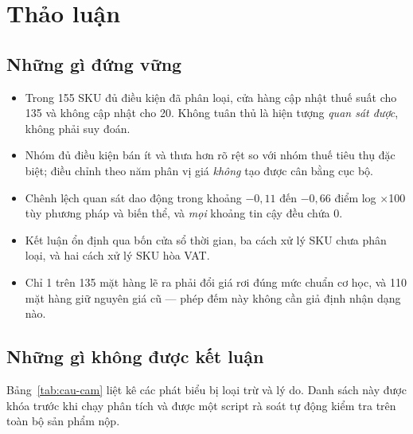 \documentclass[11pt]{article}
\newcommand{\dvi}{điểm log $\times$100}
\begin{document}
\section{Thảo luận}

\subsection{Những gì đứng vững}

\begin{itemize}
  \item Trong 155 SKU đủ điều kiện đã phân loại, cửa hàng cập nhật thuế suất cho 135 và không cập
  nhật cho 20. Không tuân thủ là hiện tượng \emph{quan sát được}, không phải suy đoán.
  \item Nhóm đủ điều kiện bán ít và thưa hơn rõ rệt so với nhóm thuế tiêu thụ đặc biệt; điều chỉnh
  theo năm phân vị giá \emph{không} tạo được cân bằng cục bộ.
  \item Chênh lệch quan sát dao động trong khoảng $-0{,}11$ đến $-0{,}66$ \dvi{} tùy phương pháp và
  biến thể, và \emph{mọi} khoảng tin cậy đều chứa 0.
  \item Kết luận ổn định qua bốn cửa sổ thời gian, ba cách xử lý SKU chưa phân loại, và hai cách xử
  lý SKU hòa VAT.
  \item Chỉ 1 trên 135 mặt hàng lẽ ra phải đổi giá rơi đúng mức chuẩn cơ học, và 110 mặt hàng giữ
  nguyên giá cũ --- phép đếm này không cần giả định nhận dạng nào.
\end{itemize}

\subsection{Những gì không được kết luận}

Bảng~\ref{tab:cau-cam} liệt kê các phát biểu bị loại trừ và lý do. Danh sách này được khóa trước
khi chạy phân tích và được một script rà soát tự động kiểm tra trên toàn bộ sản phẩm nộp.
\end{document}
